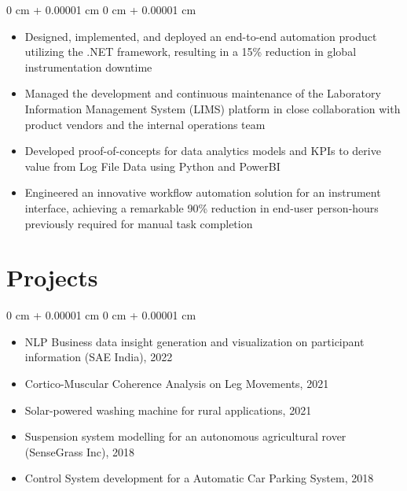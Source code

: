 \documentclass[10pt, letterpaper]{article}
\newenvironment{highlights}{
    \begin{itemize}[
        topsep=0.10 cm,
        parsep=0.10 cm,
        partopsep=0pt,
        itemsep=0pt,
        leftmargin=0 cm + 10pt
    ]
}{
    \end{itemize}
} %
\newenvironment{onecolentry}{
    \begin{adjustwidth}{
        0 cm + 0.00001 cm
    }{
        0 cm + 0.00001 cm
    }
}{
    \end{adjustwidth}
} %
\begin{document}
    \vspace{0.10 cm}
    \begin{onecolentry}
    \begin{highlights}
        \item Designed, implemented, and deployed an end-to-end automation product utilizing the .NET framework, resulting in a 15\% reduction in global instrumentation downtime
        \item Managed the development and continuous maintenance of the Laboratory Information Management System (LIMS) platform in close collaboration with product vendors and the internal operations team
        \item Developed proof-of-concepts for data analytics models and KPIs to derive value from Log File Data using Python and PowerBI
        \item Engineered an innovative workflow automation solution for an instrument interface, achieving a remarkable 90\% reduction in end-user person-hours previously required for manual task completion
    \end{highlights}
    \end{onecolentry}





    


    
\section{Projects}
    
    \begin{onecolentry}
    \begin{itemize}
        \item NLP Business data insight generation and visualization on participant information (SAE India), 2022
        \item Cortico-Muscular Coherence Analysis on Leg Movements, 2021
        \item Solar-powered washing machine for rural applications, 2021
        \item Suspension system modelling for an autonomous agricultural rover (SenseGrass Inc), 2018
        \item Control System development for a Automatic Car Parking System, 2018
    \end{itemize}
    \end{onecolentry}
    
\end{document}
